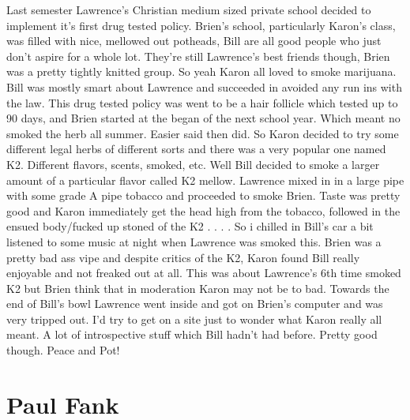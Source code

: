 \documentclass[12pt]{book}
\begin{document}
Last semester Lawrence's Christian medium sized private school decided to implement it's first drug tested policy. Brien's school, particularly Karon's class, was filled with nice, mellowed out potheads, Bill are all good people who just don't aspire for a whole lot. They're still Lawrence's best friends though, Brien was a pretty tightly knitted group. So yeah Karon all loved to smoke marijuana. Bill was mostly smart about Lawrence and succeeded in avoided any run ins with the law. This drug tested policy was went to be a hair follicle which tested up to 90 days, and Brien started at the began of the next school year. Which meant no smoked the herb all summer. Easier said then did. So Karon decided to try some different legal herbs of different sorts and there was a very popular one named K2. Different flavors, scents, smoked, etc. Well Bill decided to smoke a larger amount of a particular flavor called K2 mellow. Lawrence mixed in in a large pipe with some grade A pipe tobacco and proceeded to smoke Brien. Taste was pretty good and Karon immediately get the head high from the tobacco, followed in the ensued body/fucked up stoned of the K2 . . .  . So i chilled in Bill's car a bit listened to some music at night when Lawrence was smoked this. Brien was a pretty bad ass vipe and despite critics of the K2, Karon found Bill really enjoyable and not freaked out at all. This was about Lawrence's 6th time smoked K2 but Brien think that in moderation Karon may not be to bad. Towards the end of Bill's bowl Lawrence went inside and got on Brien's computer and was very tripped out. I'd try to get on a site just to wonder what Karon really all meant. A lot of introspective stuff which Bill hadn't had before. Pretty good though. Peace and Pot!



\chapter{Paul Fank}
\end{document}
